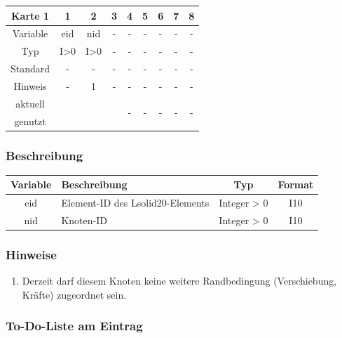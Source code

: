 \documentclass[11pt,titlepage,listof=totoc,bibliography=totoc,twoside]{scrreprt}
\begin{document}
{{\begin{table}[htbp]
\centering
\begin{tabularx}{\textwidth}{cCCCCCCCC}
\toprule
Karte 1	& 1		& 2		& 3		& 4		& 5		& 6		& 7		& 8		\\
\midrule
Variable& eid		& nid		& -		& -		& -		& -		& -		& -		\\
Typ	& I>0		& I>0		& -		& -		& -		& -		& -		& -		\\
Standard& -		& -		& -		& -		& -		& -		& -		& -		\\
Hinweis	& -		& 1		& -		& -		& -		& -		& -		& -		\\
aktuell	& 	& 	& 	& 	& 	& \multirow{2}{*}{-}	& 	& 	\\
genutzt \\
\bottomrule
\end{tabularx}
\end{table}

\subsubsection{Beschreibung}

\begin{tabularx}{\textwidth}{cXcc}
\toprule
Variable& Beschreibung				& Typ		& Format\\
\midrule
eid	& Element-ID des Lsolid20-Elements		& Integer > 0	& I10	\\
nid	& Knoten-ID				& Integer > 0	& I10	\\
\bottomrule
\end{tabularx}

\subsubsection{Hinweise}

\begin{enumerate}
\item Derzeit darf diesem Knoten keine weitere Randbedingung (Verschiebung, Kräfte) zugeordnet sein.
\end{enumerate}

\subsubsection{To-Do-Liste am Eintrag}

}}
\end{document}
